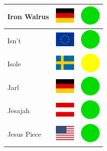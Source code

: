 \documentclass[12pt, a4paper, twoside]{report}
\begin{document}
\begin{center}
\begin{longtable}{|p{5cm}|p{2cm}|p{2cm}|}
 Iron Walrus                                                & \includegraphics[width=1cm]{../4x3/de} &   \includegraphics[width=1cm]{../likes/y} \\ \hline
 Isn't                                                      & \includegraphics[width=1cm]{../4x3/eu} &   \includegraphics[width=1cm]{../likes/y} \\ \hline
 Isole                                                      & \includegraphics[width=1cm]{../4x3/se} &   \includegraphics[width=1cm]{../likes/m} \\ \hline
 Jarl                                                       & \includegraphics[width=1cm]{../4x3/de} &   \includegraphics[width=1cm]{../likes/y} \\ \hline
 Jesajah                                                    & \includegraphics[width=1cm]{../4x3/at} &   \includegraphics[width=1cm]{../likes/y} \\ \hline
 Jesus Piece                                                & \includegraphics[width=1cm]{../4x3/us} &   \includegraphics[width=1cm]{../likes/y} \\ \hline

\end{longtable}
\end{center}
\end{document}
